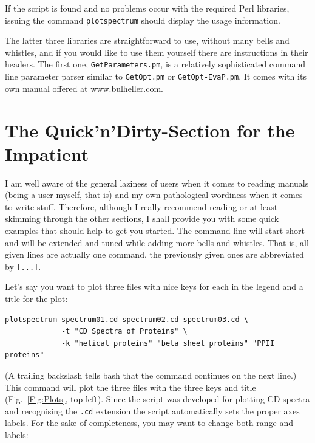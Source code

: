 \documentclass[12pt, a4paper]{article}
\begin{document}
If the script is found and no problems occur with the required Perl libraries, issuing the command \verb'plotspectrum' should display the usage information.

The latter three libraries are straightforward to use, without many bells and whistles, and if you would like to use them yourself there are instructions in their headers. The first one, \verb'GetParameters.pm', is a relatively sophisticated command line parameter parser similar to \verb'GetOpt.pm' or \verb'GetOpt-EvaP.pm'. It comes with its own manual offered at www.bulheller.com.



\newpage

\section{The Quick'n'Dirty-Section for the Impatient}

I am well aware of the general laziness of users when it comes to reading manuals (being a user myself, that is) and my own pathological wordiness when it comes to write stuff. Therefore, although I really recommend reading or at least skimming through the other sections, I shall provide you with some quick examples that should help to get you started. The command line will start short and will be extended and tuned while adding more bells and whistles. That is, all given lines are actually one command, the previously given ones are abbreviated by \verb'[...]'.

Let's say you want to plot three files with nice keys for each in the legend and a title for the plot:

\begin{verbatim}
plotspectrum spectrum01.cd spectrum02.cd spectrum03.cd \
             -t "CD Spectra of Proteins" \
             -k "helical proteins" "beta sheet proteins" "PPII proteins"
\end{verbatim}

(A trailing backslash tells bash that the command continues on the next line.) This command will plot the three files with the three keys and title (Fig.~\ref{Fig:Plots}, top left). Since the script was developed for plotting CD spectra and recognising the \verb'.cd' extension the script automatically sets the proper axes labels. For the sake of completeness, you may want to change both range and labels:
\end{document}
